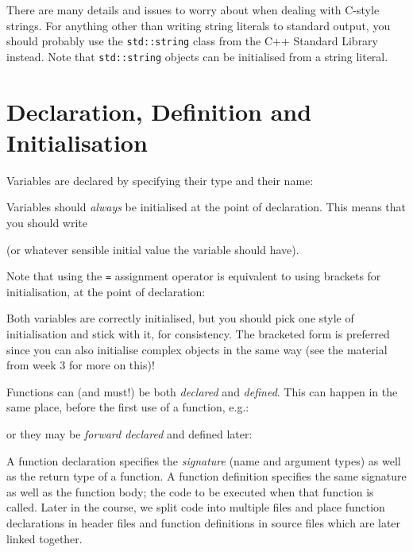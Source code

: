 \documentclass[a4paper]{scrartcl}
\begin{document}
There are many details and issues to worry about when dealing with C-style strings. For anything other than writing string literals to standard output, you should probably use the \texttt{std::string} class from the C++ Standard Library\cite{StandardLibrary} instead. Note that \texttt{std::string} objects can be initialised from a string literal.

\section{Declaration, Definition and Initialisation}
Variables are declared by specifying their type and their name:



Variables should \emph{always} be initialised at the point of declaration. This means that you should write 



(or whatever sensible initial value the variable should have).

Note that using the \texttt{=} assignment operator is equivalent to using brackets for initialisation, at the point of declaration:



Both variables are correctly initialised, but you should pick one style of initialisation and stick with it, for consistency. The bracketed form is preferred since you can also initialise complex objects in the same way (see the material from week 3 for more on this)!

Functions can (and must!) be both \emph{declared} and \emph{defined}. This can happen in the same place, before the first use of a function, e.g.:



or they may be \emph{forward declared} and defined later:



A function declaration specifies the \emph{signature} (name and argument types) as well as the return type of a function. A function definition specifies the same signature as well as the function body; the code to be executed when that function is called. Later in the course, we split code into multiple files and place function declarations in header files and function definitions in source files which are later linked together.
\end{document}
